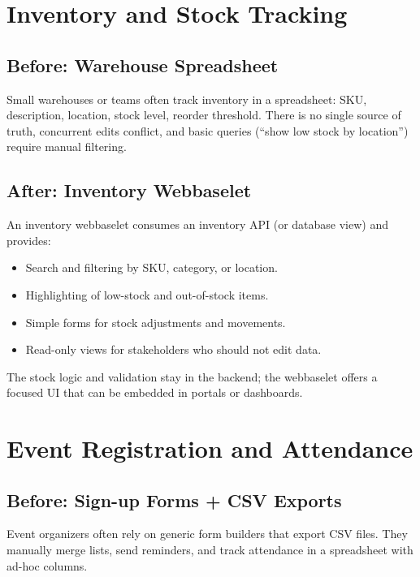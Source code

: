 \section{Inventory and Stock Tracking}

\subsection*{Before: Warehouse Spreadsheet}
Small warehouses or teams often track inventory in a spreadsheet:
SKU, description, location, stock level, reorder threshold. There is
no single source of truth, concurrent edits conflict, and basic
queries (``show low stock by location'') require manual filtering.

\subsection*{After: Inventory Webbaselet}
An inventory webbaselet consumes an inventory API (or database
view) and provides:
\begin{itemize}
  \item Search and filtering by SKU, category, or location.
  \item Highlighting of low-stock and out-of-stock items.
  \item Simple forms for stock adjustments and movements.
  \item Read-only views for stakeholders who should not edit data.
\end{itemize}
The stock logic and validation stay in the backend; the webbaselet
offers a focused UI that can be embedded in portals or dashboards.

\section{Event Registration and Attendance}

\subsection*{Before: Sign-up Forms + CSV Exports}
Event organizers often rely on generic form builders that export
CSV files. They manually merge lists, send reminders, and track
attendance in a spreadsheet with ad-hoc columns.

